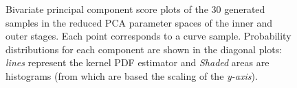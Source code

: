 \begin{figure}[!h]
\centering
{}
\caption{Bivariate principal component score plots of the 30 generated samples in the reduced PCA parameter spaces of the inner and outer stages. Each point corresponds to a curve sample. Probability distributions for each component are shown in the diagonal plots: \emph{lines} represent the kernel PDF estimator and \emph{Shaded} areas are histograms (from which are based the scaling of the \emph{y-axis}).}
\label{fig:samples-scatter}
\end{figure}

